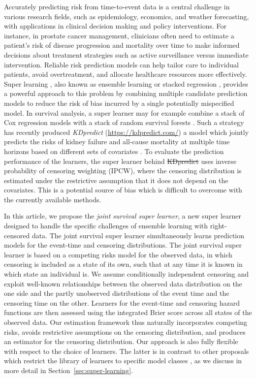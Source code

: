 \documentclass[alpha-refs]{wiley-article}
\newcommand{\1}{\mathbb{1}} %
\providecommand{\DIFaddtex}[1]{{\protect\color{blue}\uwave{#1}}} %
\providecommand{\DIFdeltex}[1]{{\protect\color{red}\sout{#1}}}                      %
\providecommand{\DIFaddbegin}{} %
\providecommand{\DIFaddend}{} %
\providecommand{\DIFdelbegin}{} %
\providecommand{\DIFdelend}{} %
\providecommand{\DIFadd}[1]{\texorpdfstring{\DIFaddtex{#1}}{#1}} %
\providecommand{\DIFdel}[1]{\texorpdfstring{\DIFdeltex{#1}}{}} %
\begin{document}
Accurately predicting risk from time-to-event data is a central
challenge in various research fields, such as epidemiology, economics,
and weather forecasting, with applications in clinical decision making
and policy interventions. For instance, in prostate cancer management,
clinicians often need to estimate a patient’s risk of disease
progression and mortality over time to make informed decisions about
treatment strategies such as active surveillance versus immediate
intervention. Reliable risk prediction models can help tailor care to
individual patients, avoid overtreatment, and allocate healthcare
resources more effectively. Super learning \citep{van2007super}, also
known as ensemble learning or stacked regression
\citep{wolpert1992stacked,breiman1996stacked}, provides a powerful
approach to this problem by combining multiple candidate prediction
models to reduce the risk of bias incurred by a single potentially
mispecified model. In survival analysis, a super learner may for
example combine a stack of Cox regression models with a stack of
random survival forests \citep[][Section 8.4]{gerds2021medical}. Such
a strategy has recently produced \textit{KDpredict}
(\url{https://kdpredict.com/}) a model which jointly predicts the
risks of kidney failure and all-cause mortality at multiple time
horizons based on different sets of covariates
\citep{liu2024predicting}. To evaluate the prediction performance of
the learners, the super learner behind \DIFdelbegin \DIFdel{KDpredict }\DIFdelend \DIFaddbegin \textit{\DIFadd{KDpredict}} \DIFaddend uses inverse
probability of censoring weighting (IPCW), where the censoring
distribution is estimated under the restrictive assumption that it
does not depend on the covariates. This is a potential source of bias
which is difficult to overcome with the currently available methods.

In this article, we propose the {\it joint survival super learner}, a
new super learner designed to handle the specific challenges of
ensemble learning with right-censored data. The joint survival super
learner simultaneously learns prediction models for the event-time and
censoring distributions. The joint survival super learner is based on
a competing risks model for the observed data, in which censoring is
included as a state of its own, such that at any time it is known in
which state an individual is. We assume conditionally independent
censoring and exploit well-known relationships between the observed
data distribution on the one side and the partly unobserved
distributions of the event time and the censoring time on the
other. Learners for the event-time and censoring hazard functions are
then assessed using the integrated Brier score across all states of
the observed data. Our estimation framework thus naturally
incorporates competing risks, avoids restrictive assumptions on the
censoring distribution, and produces an estimator for the censoring
distribution. Our approach is also fully flexible with respect to the
choice of learners. The latter is in contrast to other proposals which
restrict the library of learners to specific model classes
\citep{polley2011-sl-cens,golmakani2020super}, as we discuss in more
detail in Section~\ref{sec:super-learning}.
\end{document}
